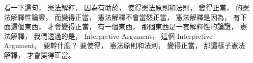 \hypertarget{w02:cue:2634}{}看一下這句，
\hypertarget{w02:cue:2635}{}憲法解釋，
\hypertarget{w02:cue:2636}{}因為有助於，
\hypertarget{w02:cue:2637}{}使得憲法原則和法則，
\hypertarget{w02:cue:2638}{}變得正當，
\hypertarget{w02:cue:2639}{}的憲法解釋性論證，
\hypertarget{w02:cue:2640}{}而變得正當，
\hypertarget{w02:cue:2641}{}憲法解釋不會當然正當，
\hypertarget{w02:cue:2642}{}憲法解釋是因為，
\hypertarget{w02:cue:2643}{}有下面這個東西，
\hypertarget{w02:cue:2644}{}才會變得正當，
\hypertarget{w02:cue:2645}{}有一個東西，
\hypertarget{w02:cue:2646}{}那個東西是一套解釋性的論證，
\hypertarget{w02:cue:2647}{}憲法解釋，
\hypertarget{w02:cue:2648}{}我們透過的是，
\hypertarget{w02:cue:2649}{}Interpretive Argument，
\hypertarget{w02:cue:2650}{}這個 Interpretive Argument，
\hypertarget{w02:cue:2651}{}要幹什麼？
\hypertarget{w02:cue:2652}{}要使得，
\hypertarget{w02:cue:2653}{}憲法原則和法則，
\hypertarget{w02:cue:2654}{}變得正當，
\hypertarget{w02:cue:2655}{}那這樣子憲法解釋，
\hypertarget{w02:cue:2656}{}才會變得正當。

